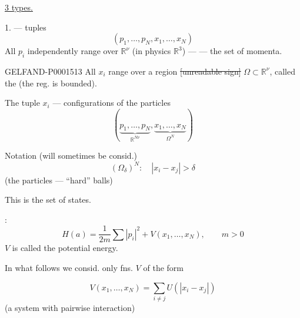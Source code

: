 \underline{3 types.}

1.  — tuples
\begin{equation*}
(p_1,\ldots, p_N, x_1,\ldots, x_N)
\end{equation*}
All $p_i$ independently range over $\mathbb R^\nu$ (in physics $\mathbb R^3$) —
— the set of momenta.

\begin{GelfandAdjacentEvidence}{GELFAND-P000151}{3}
All $x_i$ range over a region \sout{[unreadable sign]}
$\Omega\subset\mathbb R^\nu$, called the  (the reg. is bounded).
\end{GelfandAdjacentEvidence}

The tuple $x_i$ — configurations of the particles
\begin{equation*}
(\underbrace{p_1,\ldots, p_N}_{\mathbb R^{N\nu}},\underbrace{x_1,\ldots, x_N}_{\Omega^N})
\end{equation*}


Notation (will sometimes be consid.)
\begin{equation*}
(\Omega_\delta)^N:\quad |x_i-x_j|>\delta
\end{equation*}
(the particles — “hard” balls)

This is the set of states.


:
\begin{equation*}
H (a)=\frac1{2m}\sum|p_i|^2+V (x_1,\ldots, x_N),\qquad m>0
\end{equation*}
$V$ is called the potential energy.

In what follows we consid. only fns. $V$ of the form

\begin{equation*}
V (x_1,\ldots, x_N)=\sum_{i\ne j}U (|x_i-x_j|)
\end{equation*}
(a system with pairwise interaction)

